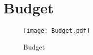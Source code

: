 \chapter{Budget} \label{App:Budget}

\begin{figure}[H]
\texttt{[image: Budget.pdf]}
\caption[]{Budget}
\label{fig:budget}
\end{figure}
